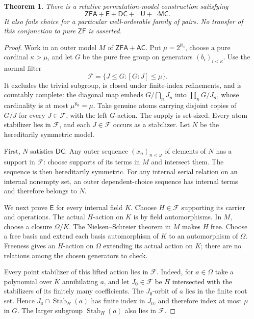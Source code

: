 \documentclass[11pt,a4paper]{article}
\newtheorem{theorem}{Theorem}[section]
\theoremstyle{definition}\newtheorem{definition}[theorem]{Definition}
\theoremstyle{remark}\newtheorem{remark}[theorem]{Remark}
\newcommand{\ZF}{\mathsf{ZF}}\newcommand{\ZFA}{\mathsf{ZFA}}
\newcommand{\AC}{\mathsf{AC}}\newcommand{\BPI}{\mathsf{BPI}}
\newcommand{\E}{\mathsf E}\newcommand{\U}{\mathsf U}
\begin{document}
\begin{theorem}\label{thm:freegroupdc}
There is a relative permutation-model construction satisfying
\[
\ZFA+\E+\mathsf{DC}+\neg\U+\neg\mathsf{MC}.
\]
It also fails choice for a particular well-orderable family of pairs. No transfer of this conjunction to pure $\ZF$ is asserted.
\end{theorem}
\begin{proof}
Work in an outer model $M$ of $\ZFA+\AC$. Put $\mu=2^{\aleph_0}$, choose a pure cardinal $\kappa>\mu$, and let $G$ be the pure free group on generators $(b_i)_{i<\kappa}$. Use the normal filter
\[
\mathcal F=\{J\leq G:[G:J]\leq\mu\}.
\]
It excludes the trivial subgroup, is closed under finite-index refinements, and is countably complete: the diagonal map embeds $G/\bigcap_nJ_n$ into $\prod_nG/J_n$, whose cardinality is at most $\mu^{\aleph_0}=\mu$. Take genuine atoms carrying disjoint copies of $G/J$ for every $J\in\mathcal F$, with the left $G$-action. The supply is set-sized. Every atom stabilizer lies in $\mathcal F$, and each $J\in\mathcal F$ occurs as a stabilizer. Let $N$ be the hereditarily symmetric model.

First, $N$ satisfies $\mathsf{DC}$. Any outer sequence $(x_n)_{n<\omega}$ of elements of $N$ has a support in $\mathcal F$: choose supports of its terms in $M$ and intersect them. The sequence is then hereditarily symmetric. For any internal serial relation on an internal nonempty set, an outer dependent-choice sequence has internal terms and therefore belongs to $N$.

We next prove $\E$ for every internal field $K$. Choose $H\in\mathcal F$ supporting its carrier and operations. The actual $H$-action on $K$ is by field automorphisms. In $M$, choose a closure $\Omega/K$. The Nielsen--Schreier theorem in $M$ makes $H$ free. Choose a free basis and extend each basis automorphism of $K$ to an automorphism of $\Omega$. Freeness gives an $H$-action on $\Omega$ extending its actual action on $K$; there are no relations among the chosen generators to check.

Every point stabilizer of this lifted action lies in $\mathcal F$. Indeed, for $a\in\Omega$ take a polynomial over $K$ annihilating $a$, and let $J_0\in\mathcal F$ be $H$ intersected with the stabilizers of its finitely many coefficients. The $J_0$-orbit of $a$ lies in the finite root set. Hence $J_0\cap\operatorname{Stab}_H(a)$ has finite index in $J_0$, and therefore index at most $\mu$ in $G$. The larger subgroup $\operatorname{Stab}_H(a)$ also lies in $\mathcal F$.


\end{proof}
\end{document}
